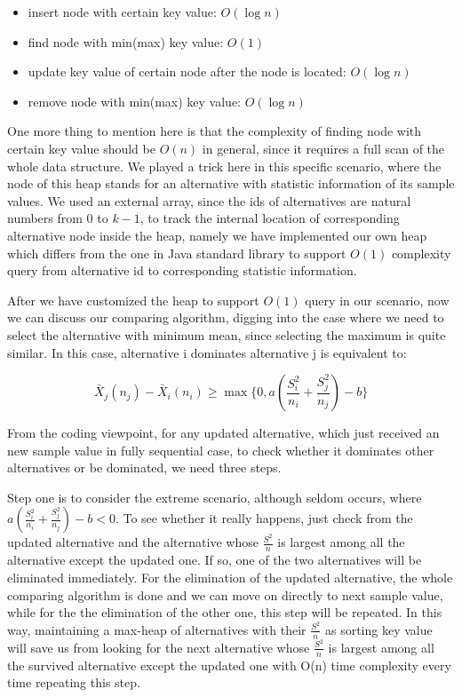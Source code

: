 \documentclass[12pt,a4]{report}
\begin{document}
\begin{itemize}
\item insert node with certain key value: $O(\log n)$
\item find node with min(max) key value: $O(1)$
\item update key value of certain node after the node is located: $O(\log n)$
\item remove node with min(max) key value: $O(\log n)$
\end{itemize}

One more thing to mention here is that the complexity of finding node with certain key value should be $O(n)$ in general, since it requires a full scan of the whole data structure. We played a trick here in this specific scenario, where the node of this heap stands for an alternative with statistic information of its sample values. We used an external array, since the ids of alternatives are natural numbers from $0$ to $k - 1$, to track the internal location of corresponding alternative node inside the heap, namely we have implemented our own heap which differs from the one in Java standard library to support $O(1)$ complexity query from alternative id to corresponding statistic information.

After we have customized the heap to support $O(1)$ query in our scenario, now we can discuss our comparing algorithm, digging into the case where we need to select the alternative with minimum mean, since selecting the maximum is quite similar. In this case, alternative i dominates alternative j is equivalent to:

$$ \bar{X}_j(n_j)-\bar{X}_i(n_i) \ge \max\{0,a(\frac{S_i^2}{n_i}+\frac{S_j^2}{n_j}) - b\} $$

From the coding viewpoint, for any updated alternative, which just received an new sample value in fully sequential case, to check whether it dominates other alternatives or be dominated, we need three steps.

Step one is to consider the extreme scenario, although seldom occurs, where $a(\frac{S_i^2}{n_i}+\frac{S_j^2}{n_j}) - b < 0$. To see whether it really happens, just check from the updated alternative and the alternative whose $\frac{S^2}{n}$ is largest among all the alternative except the updated one. If so, one of the two alternatives will be eliminated immediately. For the elimination of the updated alternative, the whole comparing algorithm is done and we can move on directly to next sample value, while for the the elimination of the other one, this step will be repeated. In this way, maintaining a max-heap of alternatives with their $\frac{S^2}{n}$ as sorting key value will save us from looking for the next alternative whose $\frac{S^2}{n}$ is largest among all the survived alternative except the updated one with O(n) time complexity every time repeating this step.
\end{document}
